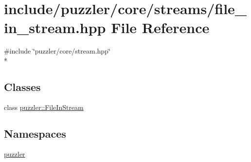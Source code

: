 \hypertarget{a00124}{}\section{include/puzzler/core/streams/file\+\_\+in\+\_\+stream.hpp File Reference}
\label{a00124}
{\ttfamily \#include \char`\"{}puzzler/core/stream.\+hpp\char`\"{}}\\*
\subsection*{Classes}
\begin{DoxyCompactItemize}
\item 
class \hyperlink{a00007}{puzzler\+::\+File\+In\+Stream}
\end{DoxyCompactItemize}
\subsection*{Namespaces}
\begin{DoxyCompactItemize}
\item 
 \hyperlink{a00145}{puzzler}
\end{DoxyCompactItemize}

